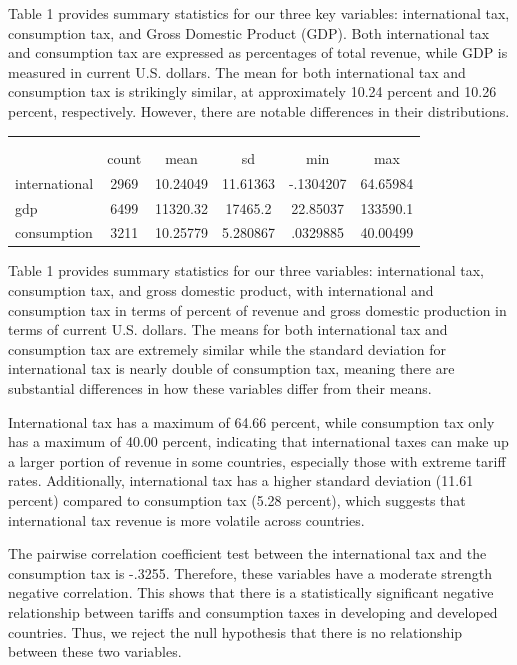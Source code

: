 \documentclass[12pt]{article}
\begin{document}
Table 1 provides summary statistics for our three key variables: international tax, consumption tax, and Gross Domestic Product (GDP). Both international tax and consumption tax are expressed as percentages of total revenue, while GDP is measured in current U.S. dollars. The mean for both international tax and consumption tax is strikingly similar, at approximately 10.24 percent and 10.26 percent, respectively. However, there are notable differences in their distributions.

{
\def\sym#1{\ifmmode^{#1}\else\(^{#1}\)\fi}
\begin{tabular}{l*{1}{ccccc}}
            &\multicolumn{5}{c}{}                                         \\
            &\multicolumn{5}{c}{}                                            \\
            &       count&        mean&          sd&         min&         max\\
\hline
international&        2969&    10.24049&    11.61363&   -.1304207&    64.65984\\
gdp         &        6499&    11320.32&     17465.2&    22.85037&    133590.1\\
consumption &        3211&    10.25779&    5.280867&    .0329885&    40.00499\\
\hline
\end{tabular}
}

Table 1 provides summary statistics for our three variables: international tax, consumption tax, and gross domestic product, with international and consumption tax in terms of percent of revenue and gross domestic production in terms of current U.S. dollars. The means for both international tax and consumption tax are extremely similar while the standard deviation for international tax is nearly double of consumption tax, meaning there are substantial differences in how these variables differ from their means.

International tax has a maximum of 64.66 percent, while consumption tax only has a maximum of 40.00 percent, indicating that international taxes can make up a larger portion of revenue in some countries, especially those with extreme tariff rates. Additionally, international tax has a higher standard deviation (11.61 percent) compared to consumption tax (5.28 percent), which suggests that international tax revenue is more volatile across countries.

The pairwise correlation coefficient test between the international tax and the consumption tax is -.3255. Therefore, these variables have a moderate strength negative correlation. This shows that there is a statistically significant negative relationship between tariffs and consumption taxes in developing and developed countries. Thus, we reject the null hypothesis that there is no relationship between these two variables. 
\end{document}

